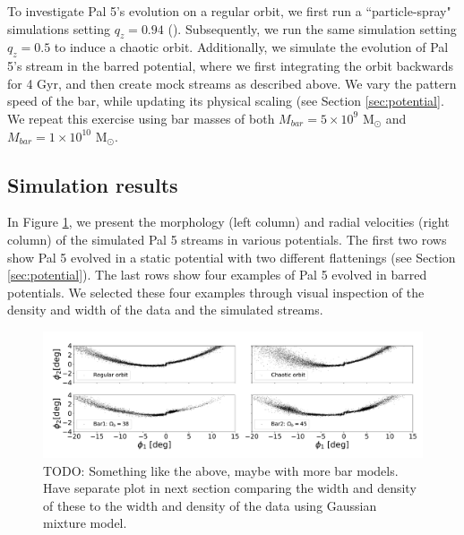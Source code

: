 \documentclass[twocolumn]{aastex62}
\newcommand{\msun}{\textrm{M}_\odot}
\newcommand{\todo}[1]{{\color{red} TODO: #1}}
\begin{document}
To investigate Pal 5's evolution on a regular orbit, we first run a ``particle-spray" simulations setting $q_z = 0.94$ (\citealt{Bovy:2016}).
Subsequently, we run the same simulation setting $q_z = 0.5$ to induce a chaotic orbit.
Additionally, we simulate the evolution of Pal 5's stream in the barred potential, where we first integrating the orbit backwards for 4 Gyr, and then create mock streams as described above.
We vary the pattern speed of the bar, while updating its physical scaling (see Section \ref{sec:potential}. %
We repeat this exercise using bar masses of both $M_{bar} = 5 \times 10^{9}$ $\msun$ and $M_{bar} = 1 \times 10^{10}$ $\msun$.

\subsection{Simulation results}
\label{sec:sim_results}
In Figure \ref{fig:sims}, we present the morphology (left column) and radial velocities (right column) of the simulated Pal 5 streams in various potentials.
The first two rows show Pal 5 evolved in a static potential with two different flattenings (see Section \ref{sec:potential}).
The last rows show four examples of Pal 5 evolved in barred potentials.
We selected these four examples through visual inspection of the density and width of the data and the simulated streams.

\begin{figure}
\centerline{\includegraphics[width=\textwidth]{Fig4_sims.pdf}}
\caption{\todo{Something like the above, maybe with more bar models. Have separate plot in next section comparing the width and density of these to the width and density of the data using Gaussian mixture model. }}
\label{fig:sims}
\end{figure}
\end{document}
